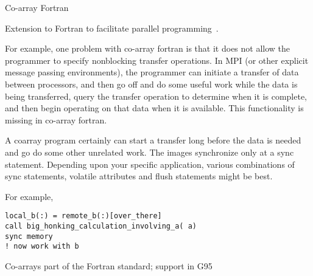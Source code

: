 
 {Co-array Fortran}

Extension to Fortran to facilitate parallel programming~\cite{coarray}.

For example, one problem with co-array fortran is that it does not
allow the programmer to specify nonblocking transfer operations. In
MPI (or other explicit message passing environments), the programmer
can initiate a transfer of data between processors, and then go off
and do some useful work while the data is being transferred, query
the transfer operation to determine when it is complete, and then
begin operating on that data when it is available. This
functionality is missing in co-array fortran.

A coarray program certainly can start a transfer long before
the data is needed and go do some other unrelated work.
The images synchronize only at a sync statement.
Depending upon your specific application, various combinations
of sync statements, volatile attributes and flush statements
might be best.

For example,

\begin{verbatim}
local_b(:) = remote_b(:)[over_there]
call big_honking_calculation_involving_a( a)
sync memory
! now work with b
\end{verbatim}

Co-arrays part of the Fortran standard;
support in G95~\cite{g95coarray}

